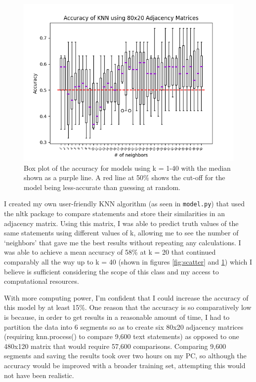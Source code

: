 \documentclass[]{article}
\begin{document}
		\begin{figure}
			\centering
			\includegraphics[width=0.8\linewidth]{accuracies-box.png}
			\caption{Box plot of the accuracy for models using k = 1-40 with the median shown as a purple line. A red line at 50\% shows the cut-off for the model being less-accurate than guessing at random.}
			\label{fig:box}
		\end{figure}
	
		I created my own user-friendly KNN algorithm (as seen in \texttt{model.py}) that used the nltk package to compare statements and store their similarities in an adjacency matrix. Using this matrix, I was able to predict truth values of the same statements using different values of k, allowing me to see the number of `neighbors' that gave me the best results without repeating any calculations.
		I was able to achieve a mean accuracy of 58\% at k = 20 that continued comparably all the way up to k = 40 (shown in figures \ref{fig:scatter} and \ref{fig:box}) which I believe is sufficient considering the scope of this class and my access to computational resources.
		
		
		With more computing power, I'm confident that I could increase the accuracy of this model by at least 15\%. One reason that the accuracy is so comparatively low is because, in order to get results in a reasonable amount of time, I had to partition the data into 6 segments so as to create six 80x20 adjacency matrices (requiring knn.process() to compare 9,600 text statements) as opposed to one 480x120 matrix that would require 57,600 comparisons. Comparing 9,600 segments and saving the results took over two hours on my PC, so although the accuracy would be improved with a broader training set, attempting this would not have been realistic.
		
\end{document}
